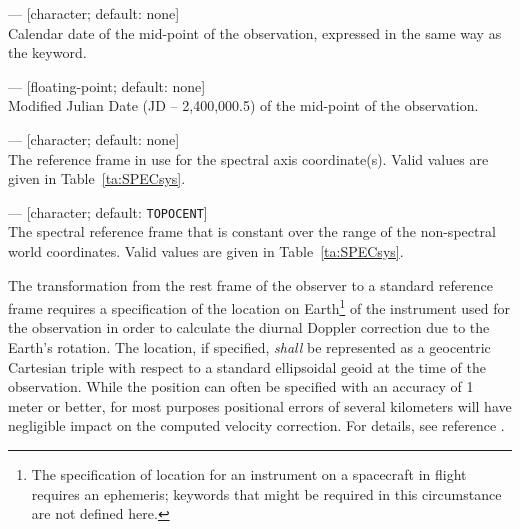 \documentclass[11pt,makeidx]{book}     %
\begin{document}
\begin{description}

\item {}  --- [character; default: none]\\ 
Calendar date of the
mid-point of the observation, expressed in the same way as 
the keyword.  

\item {}  --- [floating-point; default: none]\\ 
Modified Julian Date
(JD -- 2,400,000.5) of the mid-point of the observation.  

\item {}  --- [character; default: none]\\ 
The reference frame in
use for the spectral axis coordinate(s). Valid values are given in Table~\ref{ta:SPECsys}. 

\item {}  --- [character; default: \texttt{TOPOCENT}]\\ 
The spectral
reference frame that is constant over the range of the non-spectral world
coordinates. Valid values are given in Table~\ref{ta:SPECsys}. 

\end{description}


The transformation from the rest frame of the
observer to a standard reference frame requires a specification of the location on
Earth\footnote[1]{The specification of location for an instrument on a spacecraft in flight
requires an ephemeris; keywords that might be required in this circumstance are not defined
here.} of the instrument used for the observation in order to calculate the
diurnal Doppler correction due to the Earth's rotation.
The location, if specified, \emph{shall}
be represented as a geocentric Cartesian triple with respect to a standard ellipsoidal geoid
at the time of the observation.  While the position can often be specified with an accuracy 
of 1 meter or better, for most purposes positional errors of several kilometers will have 
negligible impact on the computed velocity correction.
For details, see reference \cite{greisen06}.
\end{document}
